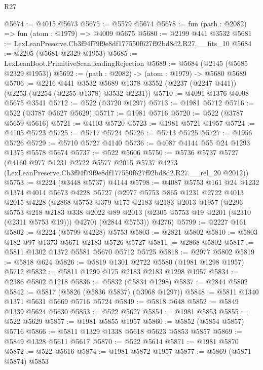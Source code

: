 \begin{lexlean}{R27}
\begin{coremodule}
@5674 := @4015 @5673
@5675 := @5579 @5674
@5678 := fun (path : @2082) => fun (atom : @1979) => @4009 @5675
@5680 := @2199 @441 @3532
@5681 := LexLeanPreserve.Cb3f94f79f9e8df177550f627f92bd8d2.R27.__fits_10
@5684 := @2205 (@5681 @2329 @1953)
@5685 := LexLeanBoot.PrimitiveScan.leadingRejection
@5689 := @5684 (@2145 (@5685 @2329 @1953))
@5692 := (path : @2082) -> (atom : @1979) -> @5680 @5689
@5706 := @2216
    @441
    @3532
    @5689
    @1378
    @3552
    (@2237 (@2247 @441))
    (@2253 (@2254 (@2255 @1378) @3532 @2231))
@5710 := @4091 @1376 @4008 @5675 @3541
@5712 := @522 (@3720 @1297)
@5713 := @1981 @5712
@5716 := @522 (@3787 @5627 @5629)
@5717 := @1981 @5716
@5720 := @522 (@3787 @5659 @5616)
@5721 := @4103 @5720
@5723 := @1981 @5721 @1957
@5724 := @4105 @5723
@5725 := @5717 @5724
@5726 := @5713 @5725
@5727 := @1956 @5726
@5729 := @5710 @5727 @4140
@5736 := @4087 @4144 @55 @24 @1293 @1375 @5578 @5674
@5737 := @522 @5606
@5750 := @5736
    @5737
    @5727
    (@4160
      @977
      @1231
      @2722
      @5577
      @2015
      @5737
      @4273
      (LexLeanPreserve.Cb3f94f79f9e8df177550f627f92bd8d2.R27.__rel_20 @2012))
@5753 := @2224 (@3448 @5737) @4144
@5798 := @4087
    @5753
    @161
    @24
    @1232
    @1374
    @4014
    @5673
    @4228
    @5727
    (@2977
      @5753
      @865
      @1231
      @2722
      @4013
      @2015
      @4228
      (@2868
        @5753
        @379
        @175
        @2183
        @2183
        @2013
        @1957
        (@2296
          @5753
          @218
          @2183
          @338
          @2022
          @89
          @2013
          (@2305 @5753 @19 @2201 (@2310 (@2311 @5753 @19)))
          @4270)
        (@2844 @5753))
      @4276)
@5799 := @2227 @161
@5802 := @2224 (@5799 @4228) @5753
@5803 := @2821 @5802
@5810 := @5803 @182 @97 @1373 @5671 @2183 @5726 @5727
@5811 := @2868 @5802
@5817 := @5811 @1302 @1372 @5581 @5670 @5712 @5725
@5818 := @2977 @5802
@5819 := @5818 @624
@5826 := @5819 @1301 @2722 @5580 (@1981 @1298 @1957) @5712
@5832 := @5811 @1299 @175 @2183 @2183 @1298 @1957
@5834 := @2386 @5802 @1218
@5836 := @5832 (@5834 @1298)
@5837 := @2844 @5802
@5842 := @5817 (@5826 (@5836 @5837) (@3968 @1297))
@5848 := @5811 @1340 @1371 @5631 @5669 @5716 @5724
@5849 := @5818 @648
@5852 := @5849 @1339 @5624 @5630
@5853 := @522 @5627
@5854 := @1981 @5853
@5855 := @522 @5629
@5857 := @1981 @5855 @1957
@5860 := @5852 (@5854 @5857) @5716
@5866 := @5811 @1329 @1338 @5618 @5623 @5853 @5857
@5869 := @5849 @1328 @5611 @5617
@5870 := @522 @5614
@5871 := @1981 @5870
@5872 := @522 @5616
@5874 := @1981 @5872 @1957
@5877 := @5869 (@5871 @5874) @5853

\end{coremodule}
\end{lexlean}
